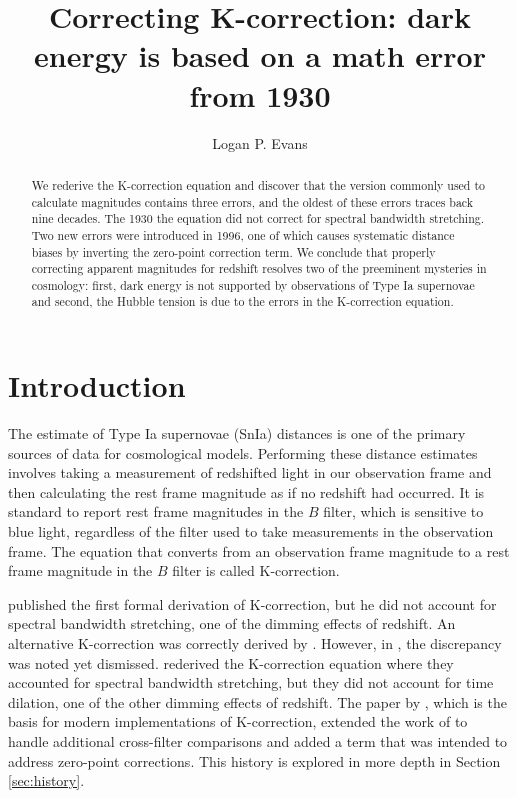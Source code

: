 \documentclass[linenumbers]{aastex631}
\begin{document}
\title{Correcting K-correction: dark energy is based on a math error from 1930}


\author[0000-0001-6450-3262]{Logan P. Evans}
\noaffiliation

\begin{abstract}
We rederive the K-correction equation and discover that the version commonly
used to calculate magnitudes contains three errors, and the oldest of these errors
traces back nine decades. The 1930 the equation did not correct for spectral
bandwidth stretching. Two new errors were introduced in 1996, one of which
causes systematic distance biases by inverting the zero-point correction term.
We conclude that properly correcting apparent magnitudes for redshift resolves
two of the preeminent mysteries in cosmology: first, dark energy is not
supported by observations of Type Ia supernovae and second, the Hubble tension
is due to the errors in the K-correction equation.
\end{abstract}


\section{Introduction}

The estimate of Type Ia supernovae (SnIa) distances is one of the primary
sources of data for cosmological models. Performing these distance estimates
involves taking a measurement of redshifted light in our observation frame and
then calculating the rest frame magnitude as if no redshift had occurred. It is
standard to report rest frame magnitudes in the $B$ filter, which is sensitive to
blue light, regardless of the filter used to take measurements in the
observation frame. The equation that converts from an observation frame
magnitude to a rest frame magnitude in the $B$ filter is called K-correction.

\citet{tolman1930} published the first formal derivation of K-correction, but
he did not account for spectral bandwidth stretching, one of the dimming
effects of redshift. An alternative K-correction was correctly derived by
\citet{desitter1934}. However, in \citet{hubble1935}, the discrepancy was noted
yet dismissed. \citet{oke1968} rederived the K-correction equation where they
accounted for spectral bandwidth stretching, but they did not account for time
dilation, one of the other dimming effects of redshift. The paper by
\citet{kim1996}, which is the basis for modern implementations of K-correction,
extended the work of \citet{oke1968} to handle additional cross-filter
comparisons and added a term that was intended to address zero-point
corrections. This history is explored in more depth in Section
\ref{sec:history}.
\end{document}
